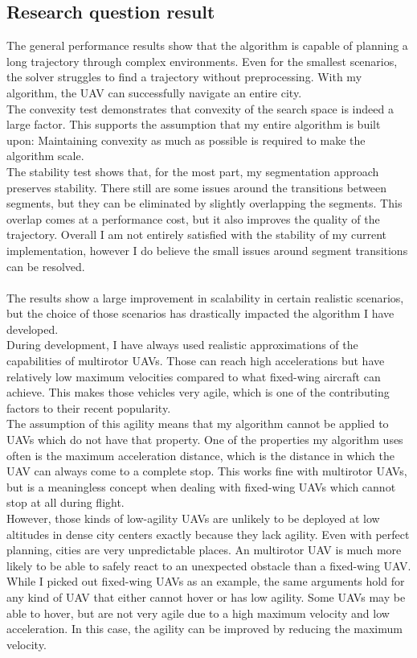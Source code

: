 \subsection{Research question result}


The general performance results show that the algorithm is capable of planning a long trajectory through complex environments. Even for the smallest scenarios, the solver struggles to find a trajectory without preprocessing. With my algorithm, the UAV can successfully navigate an entire city. \\
The convexity test demonstrates that convexity of the search space is indeed a large factor. This supports the assumption that my entire algorithm is built upon: Maintaining convexity as much as possible is required to make the algorithm scale. \\
The stability test shows that, for the most part, my segmentation approach preserves stability. There still are some issues around the transitions between segments, but they can be eliminated by slightly overlapping the segments. This overlap comes at a performance cost, but it also improves the quality of the trajectory. Overall I am not entirely satisfied with the stability of my current implementation, however I do believe the small issues around segment transitions can be resolved. \\\\

The results show a large improvement in scalability in certain realistic scenarios, but the choice of those scenarios has drastically impacted the algorithm I have developed.\\

During development, I have always used realistic approximations of the capabilities of multirotor UAVs. Those can reach high accelerations but have relatively low maximum velocities compared to what fixed-wing aircraft can achieve. This makes those vehicles very agile, which is one of the contributing factors to their recent popularity. \\
The assumption of this agility means that my algorithm cannot be applied to UAVs which do not have that property. One of the properties my algorithm uses often is the maximum acceleration distance, which is the distance in which the UAV can always come to a complete stop. This works fine with multirotor UAVs, but is a meaningless concept when dealing with fixed-wing UAVs which cannot stop at all during flight. \\
However, those kinds of low-agility UAVs are unlikely to be deployed at low altitudes in dense city centers exactly because they lack agility. Even with perfect planning, cities are very unpredictable places. An multirotor UAV is much more likely to be able to safely react to an unexpected obstacle than a fixed-wing UAV. \\
While I picked out fixed-wing UAVs as an example, the same arguments hold for any kind of UAV that either cannot hover or has low agility. Some UAVs may be able to hover, but are not very agile due to a high maximum velocity and low acceleration. In this case, the agility can be improved by reducing the maximum velocity.\\ \\

